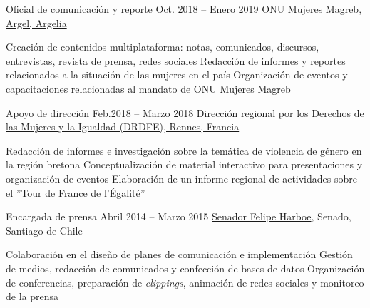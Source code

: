 \begin{joblist}

\item[Oficial de comunicación y reporte]{Oct. 2018 -- Enero 2019 }     
	{
	\href{http://maghreb.unwomen.org/fr}{ONU Mujeres Magreb, Argel, Argelia}
	}     
	{
		\normalsize{
		\vspace{-0.5cm}
		\begin{itemize}
			  \iftbftiny \setlength\itemsep{-3pt} \fi
			  \cvitem[\checkmark] Creación de contenidos multiplataforma: notas, comunicados, discursos, entrevistas, revista de prensa, redes sociales
 			  \cvitem[\checkmark] Redacción de informes y reportes relacionados a la situación de las mujeres en el país                                      
			  \cvitem[\checkmark] Organización de eventos y capacitaciones relacionadas al mandato de ONU Mujeres Magreb
		\end{itemize}      
        }
	}


\item[Apoyo de dirección]{Feb.2018 -- Marzo 2018 }     
	{
	\tbflogo{../Figure/logo/drdfe_128.png}
	\href{https://www.egalite-femmes-hommes.gouv.fr/le-secretariat-d-etat/organisation-du-ministere/services-territoriaux/annuaire-des-equipes-regionales-et-departementales/}{Dirección regional por los Derechos de las Mujeres y la Igualdad (DRDFE), Rennes, Francia}
	}     
	{
		\normalsize{            		
		\iftbftiny \vspace{-0.5cm} \fi
		\begin{itemize}
			  \iftbftiny \setlength\itemsep{-3pt} \fi
			  \cvitem[\checkmark] Redacción de informes e investigación sobre la temática de violencia de género en la región bretona
			  \cvitem[\checkmark] Conceptualización de material interactivo para presentaciones y organización de eventos
			  \cvitem[\checkmark] Elaboración de un informe regional de actividades sobre el ''Tour de France de l'Égalité''
		\end{itemize}      
        }
	}



\item[Encargada de prensa ]{Abril 2014 -- Marzo 2015}
     {
     \href{https://www.harboe.cl/}{Senador Felipe Harboe}, Senado, Santiago de Chile
     } 
	 {
		\normalsize{
		\iftbftiny \vspace{-0.5cm} \fi
			\begin{itemize}
			  \iftbftiny \setlength\itemsep{-3pt} \fi
			  \cvitem[\checkmark] Colaboración en el diseño de planes de comunicación e implementación
			  \cvitem[\checkmark] Gestión de medios, redacción de comunicados y confección de bases de datos
			  \cvitem[\checkmark] Organización de conferencias, preparación de \textit{clippings}, animación de redes sociales y monitoreo de la prensa 
			  

\end{itemize}}}
\end{joblist}
